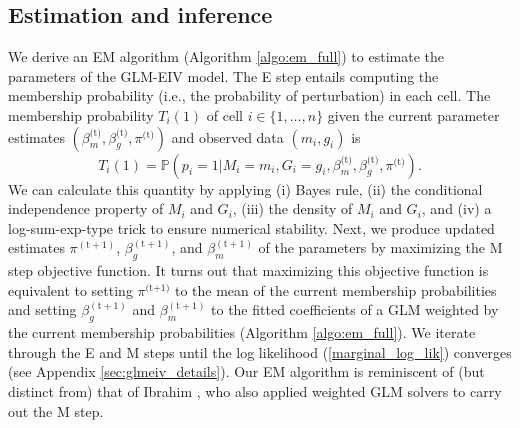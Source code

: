 \documentclass[12pt]{article}
\begin{document}
\subsection{Estimation and inference}

We derive an EM algorithm (Algorithm \ref{algo:em_full}) to estimate the parameters of the GLM-EIV model. The E step entails computing the membership probability (i.e., the probability of perturbation) in each cell. The membership probability $T_i(1)$ of cell $i \in \{1, \dots, n\}$ given the current parameter estimates $(\beta_m^\textrm{(t)}, \beta_g^\textrm{(t)}, \pi^\textrm{(t)})$ and observed data $(m_i, g_i)$ is
$$T_i(1) = \mathbb{P}(p_i = 1| M_i = m_i, G_i = g_i, \beta^\textrm{(t)}_m, \beta^\textrm{(t)}_g, \pi^\textrm{(t)}).$$ We can calculate this quantity by applying (i) Bayes rule, (ii) the conditional independence property of $M_i$ and $G_i$, (iii) the density of $M_i$ and $G_i$, and (iv) a log-sum-exp-type trick to ensure numerical stability. Next, we produce updated estimates $\pi^{(\textrm{t} +1)}$, $\beta_g^{(\textrm{t}+1)}$, and $\beta_m^{(\textrm{t}+1)}$ of the parameters by maximizing the M step objective function. It turns out that maximizing this objective function is equivalent to setting $\pi^{\textrm{(t+1)}}$ to the mean of the current membership probabilities and setting $\beta_g^{(\textrm{t}+1)}$ and $\beta_m^{(\textrm{t}+1)}$ to the fitted coefficients of a GLM weighted by the current membership probabilities (Algorithm \ref{algo:em_full}). We iterate through the E and M steps until the log likelihood (\ref{marginal_log_lik}) converges (see Appendix \ref{sec:glmeiv_details}). Our EM algorithm is reminiscent of (but distinct from) that of Ibrahim  \parencite{Ibrahim1990}, who also applied weighted GLM solvers to carry out the M step.
\end{document}
